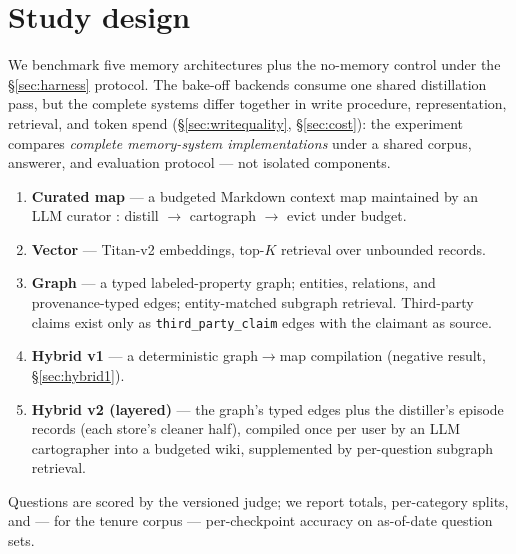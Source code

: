 \section{Study design}
\label{sec:design}

We benchmark five memory architectures plus the no-memory control under the
\S\ref{sec:harness} protocol. The bake-off backends consume one shared
distillation pass, but the complete systems differ together in write
procedure, representation, retrieval, and token spend
(\S\ref{sec:writequality}, \S\ref{sec:cost}): the experiment compares
\emph{complete memory-system implementations} under a shared corpus,
answerer, and evaluation protocol --- not isolated components.

\begin{enumerate}
\item \textbf{Curated map} --- a budgeted Markdown context map maintained by
  an LLM curator \citep[the PEEK shape;][]{gu2026peek}: distill
  $\rightarrow$ cartograph $\rightarrow$ evict under budget.
\item \textbf{Vector} --- Titan-v2 embeddings, top-$K$ retrieval over
  unbounded records.
\item \textbf{Graph} --- a typed labeled-property graph; entities,
  relations, and provenance-typed edges; entity-matched subgraph retrieval.
  Third-party claims exist only as \texttt{third\_party\_claim} edges with
  the claimant as source.
\item \textbf{Hybrid v1} --- a deterministic graph$\rightarrow$map
  compilation (negative result, \S\ref{sec:hybrid1}).
\item \textbf{Hybrid v2 (layered)} --- the graph's typed edges plus the
  distiller's episode records (each store's cleaner half), compiled once per
  user by an LLM cartographer into a budgeted wiki, supplemented by
  per-question subgraph retrieval.
\end{enumerate}

Questions are scored by the versioned judge; we report totals, per-category
splits, and --- for the tenure corpus --- per-checkpoint accuracy on
as-of-date question sets.
